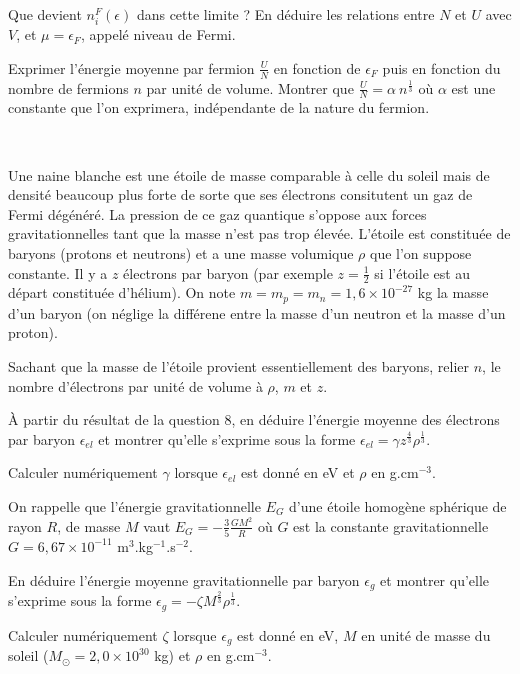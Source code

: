 \question Que devient $n_i^F(\epsilon)$ dans cette limite ? En déduire les relations entre $N$ et $U$ avec $V$, et $\mu=\epsilon_F$, appelé niveau de Fermi.

\question Exprimer l'énergie moyenne par fermion $\frac{U}{N}$ en fonction de $\epsilon_F$ puis en fonction du nombre de fermions $n$ par unité de volume. Montrer que $\frac{U}{N}=\alpha \ n^{\frac{1}{3}}$ où $\alpha$ est une constante que l'on exprimera, indépendante de la nature du fermion.


\ 

Une naine blanche est une étoile de masse comparable à celle du soleil mais de densité beaucoup plus forte de sorte que ses électrons consitutent un gaz de Fermi dégénéré. La pression de ce gaz quantique s'oppose aux forces gravitationnelles tant que la masse n'est pas trop élevée. L'étoile est constituée de baryons (protons et neutrons) et a une masse volumique $\rho$ que l'on suppose constante. Il y a $z$ électrons par baryon (par exemple $z=\frac{1}{2}$ si l'étoile est au départ constituée d'hélium). On note $m=m_p=m_n=1,6 \times 10^{-27}$ kg la masse d'un baryon (on néglige la différene entre la masse d'un neutron et la masse d'un proton).

\question Sachant que la masse de l'étoile provient essentiellement des baryons, relier $n$, le nombre d'électrons par unité de volume à $\rho$, $m$ et $z$.

\question \`A partir du résultat de la question 8, en déduire l'énergie moyenne des électrons par baryon $\epsilon_{el}$ et montrer qu'elle s'exprime sous la forme $\epsilon_{el}=\gamma z^{\frac{4}{3}} \rho^{\frac{1}{3}}$. 

\question Calculer numériquement $\gamma$ lorsque $\epsilon_{el}$ est donné en eV et $\rho$ en g.cm$^{-3}$.

On rappelle que l'énergie gravitationnelle $E_G$ d'une étoile homogène sphérique de rayon $R$, de masse $M$ vaut $E_G=-\frac{3}{5}\frac{GM^2}{R}$ où $G$ est la constante gravitationnelle $G=6,67 \times 10^{-11}$  m$^3$.kg$^{-1}$.s$^{-2}$. 

\question En déduire l'énergie moyenne gravitationnelle par baryon $\epsilon_{g}$ et montrer qu'elle s'exprime sous la forme $\epsilon_{g}=-\zeta M^{\frac{2}{3}} \rho^{\frac{1}{3}}$.

\question Calculer numériquement $\zeta$ lorsque $\epsilon_{g}$ est donné en eV, $M$ en unité de masse du soleil ($M_{\odot}=2,0 \times 10^{30}$ kg) et  $\rho$ en g.cm$^{-3}$.

